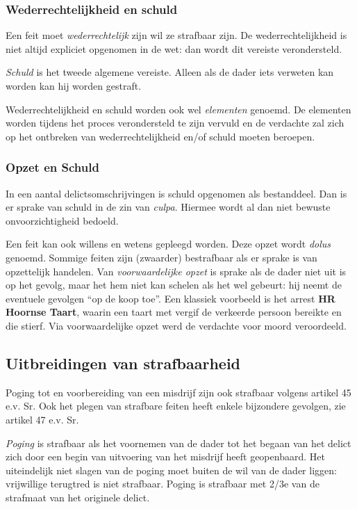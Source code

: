 \documentclass{article}
\begin{document}
\subsubsection{Wederrechtelijkheid en schuld}

Een feit moet \emph{wederrechtelijk} zijn wil ze strafbaar zijn. De
wederrechtelijkheid is niet altijd expliciet opgenomen in de wet: dan wordt dit
vereiste verondersteld.

\emph{Schuld} is het tweede algemene vereiste. Alleen als de dader iets verweten
kan worden kan hij worden gestraft.

Wederrechtelijkheid en schuld worden ook wel \emph{elementen} genoemd. De
elementen worden tijdens het proces verondersteld te zijn vervuld en de
verdachte zal zich op het ontbreken van wederrechtelijkheid en/of schuld
moeten beroepen.

\subsubsection{Opzet en Schuld}

In een aantal delictsomschrijvingen is schuld opgenomen als bestanddeel. Dan is
er sprake van schuld in de zin van \emph{culpa}. Hiermee wordt al dan niet
bewuste onvoorzichtigheid bedoeld.

Een feit kan ook willens en wetens gepleegd worden. Deze opzet wordt
\emph{dolus} genoemd. Sommige feiten zijn (zwaarder) bestrafbaar als er sprake
is van opzettelijk handelen. Van \emph{voorwaardelijke opzet} is sprake als de
dader niet uit is op het gevolg, maar het hem niet kan schelen als het wel
gebeurt: hij neemt de eventuele gevolgen ``op de koop toe''. Een klassiek voorbeeld
is het arrest \textbf{HR Hoornse Taart}, waarin een taart met vergif de verkeerde
persoon bereikte en die stierf. Via voorwaardelijke opzet werd de verdachte voor
moord veroordeeld.

\subsection{Uitbreidingen van strafbaarheid}

Poging tot en voorbereiding van een misdrijf zijn ook strafbaar volgens artikel
45 e.v. Sr. Ook het plegen van strafbare feiten heeft enkele bijzondere gevolgen,
zie artikel 47 e.v. Sr.

\emph{Poging} is strafbaar als het voornemen van de dader tot het begaan van
het delict zich door een begin van uitvoering van het misdrijf heeft
geopenbaard. Het uiteindelijk niet slagen van de poging moet buiten de wil van
de dader liggen: vrijwillige terugtred is niet strafbaar. Poging is strafbaar
met 2/3e van de strafmaat van het originele delict.
\end{document}
